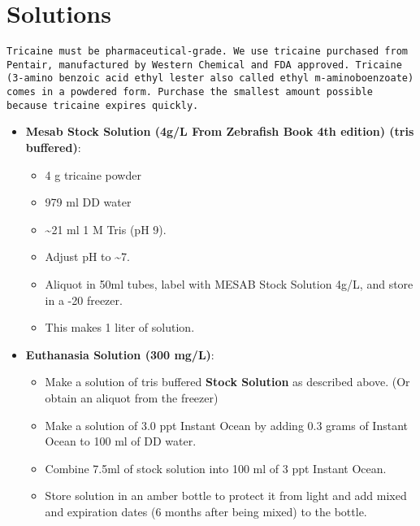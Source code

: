 \documentclass[
  letterpaper,
  DIV=11,
  numbers=noendperiod]{scrreprt}
\providecommand{\tightlist}{%
  \setlength{\itemsep}{0pt}\setlength{\parskip}{0pt}}\usepackage{longtable,booktabs,array}
\begin{document}
\hypertarget{solutions-13}{%
\section{Solutions}\label{solutions-13}}

\begin{tcolorbox}[enhanced jigsaw, bottomtitle=1mm, rightrule=.15mm, toptitle=1mm, opacitybacktitle=0.6, bottomrule=.15mm, titlerule=0mm, coltitle=black, leftrule=.75mm, arc=.35mm, colback=white, colframe=quarto-callout-warning-color-frame, left=2mm, colbacktitle=quarto-callout-warning-color!10!white, title=\textcolor{quarto-callout-warning-color}{\faExclamationTriangle}\hspace{0.5em}{NOTES}, toprule=.15mm, opacityback=0, breakable]

\begin{verbatim}
Tricaine must be pharmaceutical-grade. We use tricaine purchased from Pentair, manufactured by Western Chemical and FDA approved. Tricaine (3-amino benzoic acid ethyl lester also called ethyl m-aminoboenzoate) comes in a powdered form. Purchase the smallest amount possible because tricaine expires quickly.
\end{verbatim}

\end{tcolorbox}

\begin{itemize}
\item
  \textbf{Mesab Stock Solution (4g/L From Zebrafish Book 4th edition)
  (tris buffered)}:

  \begin{itemize}
  \tightlist
  \item
    4 g tricaine powder
  \item
    979 ml DD water
  \item
    \textasciitilde21 ml 1 M Tris (pH 9).
  \item
    Adjust pH to \textasciitilde7.
  \item
    Aliquot in 50ml tubes, label with MESAB Stock Solution 4g/L, and
    store in a -20 freezer.
  \item
    This makes 1 liter of solution.
  \end{itemize}
\item
  \textbf{Euthanasia Solution (300 mg/L)}:

  \begin{itemize}
  \tightlist
  \item
    Make a solution of tris buffered \textbf{Stock Solution} as
    described above. (Or obtain an aliquot from the freezer)
  \item
    Make a solution of 3.0 ppt Instant Ocean by adding 0.3 grams of
    Instant Ocean to 100 ml of DD water.
  \item
    Combine 7.5ml of stock solution into 100 ml of 3 ppt Instant Ocean.
  \item
    Store solution in an amber bottle to protect it from light and add
    mixed and expiration dates (6 months after being mixed) to the
    bottle.
  \end{itemize}
\end{itemize}
\end{document}

